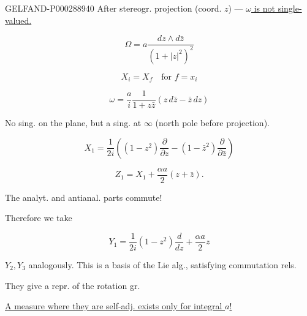 \begin{GelfandAdjacentEvidence}{GELFAND-P000288}{940}
After stereogr. projection (coord. $z$) --- \underline{$\omega$ is not single-valued.}





\begin{equation*}\Omega=a\frac{dz\wedge d\bar z}{(1+|z|^2)^2}\end{equation*}

\begin{equation*}X_i=X_f\quad\text{for }f=x_i\end{equation*}

\begin{equation*}\omega=\frac{a}{i}\frac{1}{1+z\bar z}(z\, d\bar z-\bar z\, dz)\end{equation*}

\end{GelfandAdjacentEvidence}


No sing. on the plane, but a sing. at $\infty$ (north pole before projection).

\begin{equation*}X_1=\frac{1}{2i}\left ((1-z^2)\frac{\partial}{\partial z}-(1-\bar z^2)\frac{\partial}{\partial\bar z}\right)\end{equation*}

\begin{equation*}Z_1=X_1+\frac{\alpha a}{2}(z+\bar z).\end{equation*}

The analyt. and antianal. parts commute!

Therefore we take

\begin{equation*}Y_1=\frac{1}{2i}(1-z^2)\frac{d}{dz}+\frac{\alpha a}{2}z\end{equation*}

$Y_2, Y_3$ analogously. This is a basis of the Lie alg., satisfying commutation rels.



They give a repr. of the rotation gr.

\underline{A measure where they are self-adj. exists only for integral $a$!}

